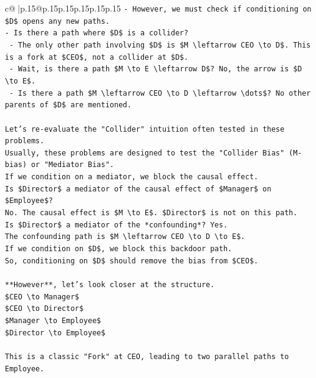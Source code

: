 \documentclass{article}
\begin{document}
{\begin{supertabular}{c@{$\;$}|p{.15\linewidth}@{}p{.15\linewidth}p{.15\linewidth}p{.15\linewidth}p{.15\linewidth}p{.15\linewidth}}
{{{\texttt{{-} However, we must check if conditioning on \$D\$ opens any new paths.} \\
\texttt{{-} Is there a path where \$D\$ is a collider?} \\
\texttt{    {-} The only other path involving \$D\$ is \$M \textbackslash{}leftarrow CEO \textbackslash{}to D\$. This is a fork at \$CEO\$, not a collider at \$D\$.} \\
\texttt{    {-} Wait, is there a path \$M \textbackslash{}to E \textbackslash{}leftarrow D\$? No, the arrow is \$D \textbackslash{}to E\$.} \\
\texttt{    {-} Is there a path \$M \textbackslash{}leftarrow CEO \textbackslash{}to D \textbackslash{}leftarrow \textbackslash{}dots\$? No other parents of \$D\$ are mentioned.} \\
\\ 
\texttt{Let's re{-}evaluate the "Collider" intuition often tested in these problems.} \\
\texttt{Usually, these problems are designed to test the "Collider Bias" (M{-}bias) or "Mediator Bias".} \\
\texttt{If we condition on a mediator, we block the causal effect.} \\
\texttt{Is \$Director\$ a mediator of the causal effect of \$Manager\$ on \$Employee\$?} \\
\texttt{No. The causal effect is \$M \textbackslash{}to E\$. \$Director\$ is not on this path.} \\
\texttt{Is \$Director\$ a mediator of the *confounding*? Yes.} \\
\texttt{The confounding path is \$M \textbackslash{}leftarrow CEO \textbackslash{}to D \textbackslash{}to E\$.} \\
\texttt{If we condition on \$D\$, we block this backdoor path.} \\
\texttt{So, conditioning on \$D\$ should remove the bias from \$CEO\$.} \\
\\ 
\texttt{**However**, let's look closer at the structure.} \\
\texttt{\$CEO \textbackslash{}to Manager\$} \\
\texttt{\$CEO \textbackslash{}to Director\$} \\
\texttt{\$Manager \textbackslash{}to Employee\$} \\
\texttt{\$Director \textbackslash{}to Employee\$} \\
\\ 
\texttt{This is a classic "Fork" at CEO, leading to two parallel paths to Employee.} \\
}}}
\end{supertabular}}
\end{document}
